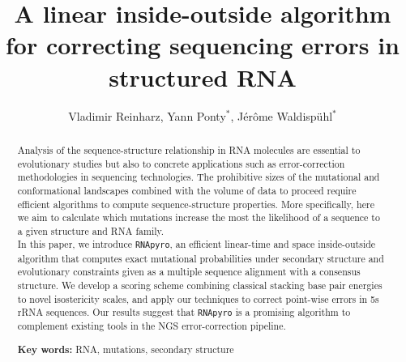 \documentclass[11pt]{article}
\title{A linear inside-outside algorithm for correcting sequencing errors in structured RNA}
\author{Vladimir Reinharz, Yann Ponty$^{*}$, J\'er\^{o}me Waldisp\"{u}hl$^*$}
\date{}
\newcommand{\RNApyro}{\texttt{RNApyro}\xspace}
\begin{document}
\maketitle
\begin{abstract}
Analysis of the sequence-structure relationship in RNA molecules are essential to evolutionary studies but also to 
concrete applications such as error-correction methodologies in sequencing technologies. The prohibitive sizes of the
mutational and conformational landscapes combined with the volume of data to proceed require efficient algorithms 
to compute sequence-structure properties. More specifically, here we aim to calculate which mutations increase the most the 
likelihood of a sequence to a given structure and RNA family.\\
In this paper, we introduce \RNApyro, an efficient linear-time and space inside-outside algorithm that computes exact mutational
probabilities under secondary structure and evolutionary constraints given as a multiple sequence alignment with a consensus structure.
We develop a scoring scheme combining classical stacking base pair energies to novel isostericity scales, and apply our techniques
to correct point-wise errors in 5s rRNA sequences. Our results suggest that \RNApyro is a promising algorithm to complement existing
tools in the NGS error-correction pipeline. 

\noindent
\textbf{Key words:} RNA, mutations, secondary structure
\end{abstract}

\newpage











\newpage



\end{document}

